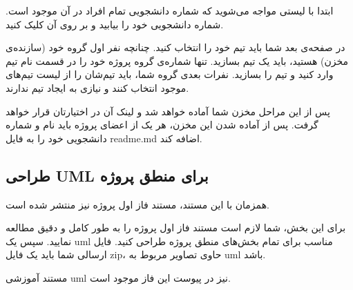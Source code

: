 \documentclass[]{article}
\begin{document}
ابتدا با لیستی مواجه می‌شوید که شماره دانشجویی تمام افراد در آن موجود است. شماره دانشجویی خود را بیابید و بر روی آن کلیک کنید.

در صفحه‌ی بعد شما باید تیم خود را انتخاب کنید. چنانچه نفر اول گروه خود (سازنده‌ی مخزن) هستید، باید یک تیم بسازید. تنها شماره‌ی گروه پروژه خود را در قسمت نام تیم وارد کنید و تیم را بسازید. نفرات بعدی گروه شما، باید تیم‌شان را از لیست تیم‌های موجود انتخاب کنند و نیازی به ایجاد تیم ندارند.

پس از این مراحل مخزن شما آماده خواهد شد و لینک آن در اختیارتان قرار خواهد گرفت. پس از آماده شدن این مخزن، هر یک از اعضای پروژه باید نام و شماره دانشجویی خود را به فایل readme.md اضافه کند.

\newpage
\subsection*{{\titr طراحی UML برای منطق پروژه}}
\label{subsec:uml}

همزمان با این مستند، مستند فاز اول پروژه نیز منتشر شده است.

برای این بخش، شما لازم است مستند فاز اول پروژه را به طور کامل و دقیق مطالعه نمایید. سپس یک uml مناسب برای تمام بخش‌های منطق پروژه طراحی کنید. فایل ارسالی شما باید یک فایل zip، حاوی تصاویر مربوط به uml باشد.

مستند آموزشی uml نیز در پیوست این فاز موجود است.
\end{document}
